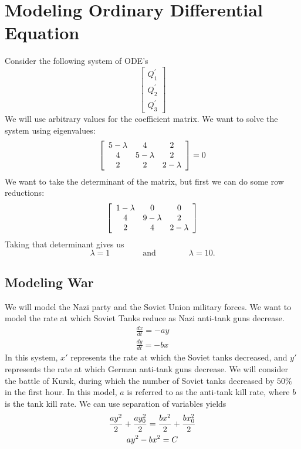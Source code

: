 \documentclass{hw}
\begin{document}
\section{Modeling Ordinary Differential Equation}
Consider the following system of ODE's
\[
\left[
\begin{array}{c}
Q_{1}^\prime\\
Q_{2}^\prime\\
Q_{3}^\prime
\end{array}
\right]
\]
We will use arbitrary values for the coefficient matrix. We want to solve the system using
eigenvalues:
\[
\left[
\begin{array}{c c c}
5-\lambda & 4 & 2\\
4 & 5-\lambda & 2\\
2 & 2 & 2-\lambda
\end{array}
\right]
= 0
\]
We want to take the determinant of the matrix, but first we can do some row reductions:
\[
\left[
\begin{array}{c c c}
1-\lambda & 0 & 0\\
4 & 9-\lambda & 2\\
2 & 4 & 2-\lambda
\end{array}
\right]
\]
Taking that determinant gives us
\[
\lambda = 1 \qquad\qquad\text{and}\qquad\qquad \lambda = 10.
\]

\subsection{Modeling War}
We will model the Nazi party and the Soviet Union military forces. We want to model the rate
at which Soviet Tanks reduce as Nazi anti-tank guns decrease.
\begin{gather*}
\frac{dx}{dt} = -ay\\
\frac{dy}{dt} = -bx
\end{gather*}
In this system, $x'$ represents the rate at which the Soviet tanks decreased, and $y'$ represents
the rate at which German anti-tank guns decrease. We will consider the battle of Kursk, during
which the number of Soviet tanks decreased by $50\%$ in the first hour. In this model, $a$ is
referred to as the anti-tank kill rate, where $b$ is the tank kill rate. We can use separation
of variables yields
\begin{gather*}
{ay^2\over2}+{ay_{0}^{2}\over2} = {bx^2\over2}+{bx_{0}^{2}\over2}\\
ay^{2}-bx^{2}=C
\end{gather*}
\end{document}

